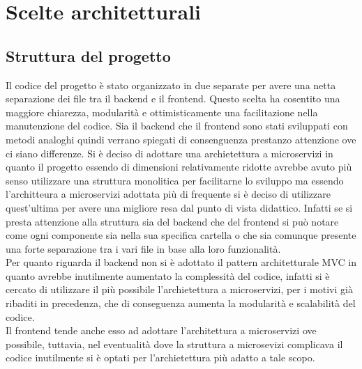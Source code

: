 \section{Scelte architetturali}
\subsection{Struttura del progetto}
    Il codice del progetto è stato organizzato in due separate per avere una netta separazione 
    dei file tra il backend e il frontend. Questo scelta ha cosentito una maggiore chiarezza, 
    modularità e ottimisticamente una facilitazione nella manutenzione del codice.
    Sia il backend che il frontend sono stati sviluppati con metodi analoghi quindi verrano 
    spiegati di consenguenza prestanzo attenzione ove ci siano differenze.
    Si è deciso di adottare una archietettura a microservizi in quanto il progetto essendo 
    di dimensioni relativamente ridotte avrebbe avuto più senso utilizzare una struttura monolitica 
    per facilitarne lo sviluppo ma essendo l'architteura a microservizi adottata più di frequente 
    si è deciso di utilizzare quest'ultima per avere una migliore resa dal punto di vista didattico. 
    Infatti se si presta attenzione alla struttura sia del backend che del frontend si può notare 
    come ogni componente sia nella sua specifica cartella o che sia comunque presente una forte 
    separazione tra i vari file in base alla loro funzionalità. \\
    Per quanto riguarda il backend non si è adottato il pattern architetturale MVC in quanto 
    avrebbe inutilmente aumentato la complessità del codice, infatti si è cercato di utilizzare il più 
    possibile l'archietettura a microservizi, per i motivi già ribaditi in precedenza, che di conseguenza 
    aumenta la modularità e scalabilità del codice.\\
    Il frontend tende anche esso ad adottare l'architettura a microservizi ove possibile, tuttavia,
    nel eventualità dove la struttura a microsevizi complicava il codice inutilmente si è optati per 
    l'archietettura più adatto a tale scopo.
